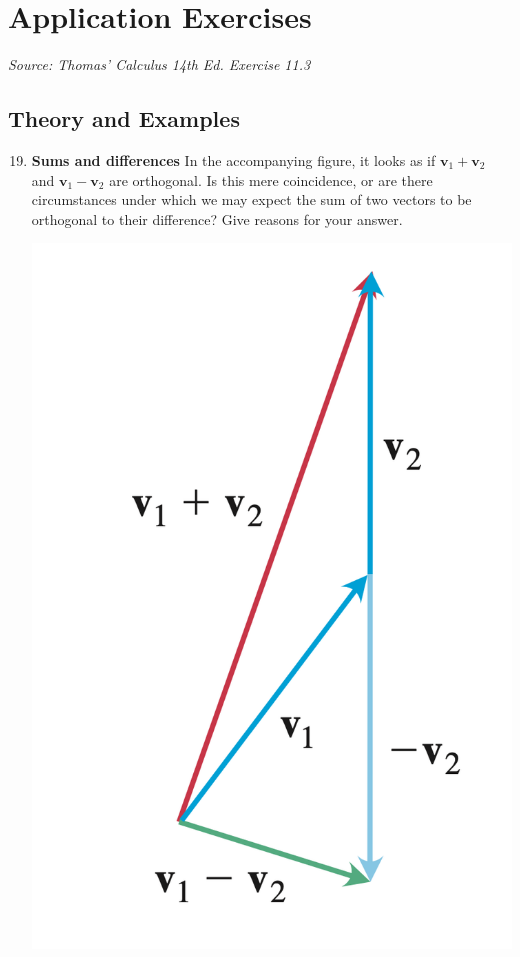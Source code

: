\newpage

\section*{Application Exercises}
\textit{Source: Thomas' Calculus 14th Ed. Exercise 11.3}

\subsection*{Theory and Examples}

\begin{enumerate}
    \setcounter{enumi}{18}
    \item \textbf{Sums and differences} In the accompanying figure, it looks as if
          $\mathbf{v}_1+\mathbf{v}_2$ and $\mathbf{v}_1-\mathbf{v}_2$ are orthogonal. Is
          this mere coincidence, or are there circumstances under which we may expect the
          sum of two vectors to be orthogonal to their difference? Give reasons for your
          answer. \begin{center}
              \includegraphics[scale=0.3]{./assets/thomas12.3q19.png}
          \end{center}


\end{enumerate}
